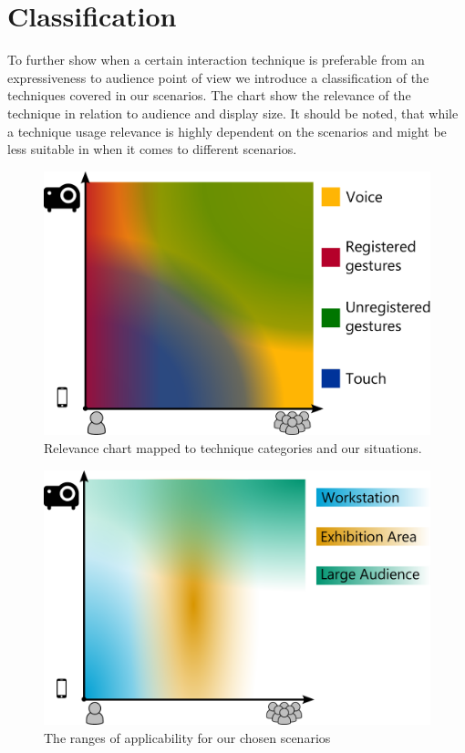 \documentclass[review,journal]{vgtc}         %
\begin{document}
\section{Classification}

To further show when a certain interaction technique is preferable from an expressiveness to audience point of view we introduce a classification of the techniques covered in our scenarios. The chart show the relevance of the technique in relation to audience and display size. It should be noted, that while a technique usage relevance is highly dependent on the scenarios and might be less suitable in when it comes to different scenarios.

\begin{figure}[htb]
	\centering
	\includegraphics[width=1.0\linewidth]{classification.pdf}
	\caption{Relevance chart mapped to technique categories and our situations.}
	\label{classifiy_diagram}
\end{figure}

\begin{figure}[htb]
	\centering
	\includegraphics[width=1.0\linewidth]{expressivity.pdf}
	\caption{The ranges of applicability for our chosen scenarios}
	\label{scenario_diagram}
\end{figure}
\end{document}
